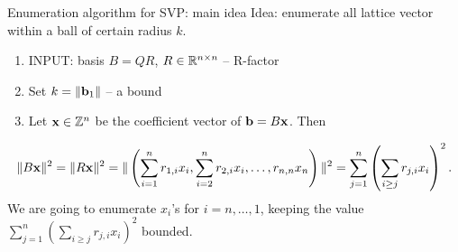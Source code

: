 \documentclass[usenames,dvipsnames, 9pt, aspectratio=169]{beamer}
\begin{document}
\begin{frame}{Enumeration algorithm for SVP: main idea}
\Large
{\color{Orange} Idea:} enumerate all lattice vector within a ball of certain radius $k$.

\begin{enumerate}
	\item INPUT: basis $B = QR$, $R \in {{\mathbb R}}^{n \times n}$ -- R-factor \pause
	\item Set $k = \| \mathbf{b}_1 \|$ -- a bound 
	\item Let $\mathbf{x} \in {{\mathbb Z}}^n$ be the coefficient vector of $\mathbf{b} = B\mathbf{x}$. Then
\end{enumerate}
\begin{align*}\label{eq:enum_norm}
\| B\mathbf{x} \|^2   = \| R\mathbf{x} \|^2 = \| \left( \sum_{i=1}^n r_{1,i}x_i, \sum_{i=2}^n r_{2,i}x_i, \ldots, r_{n,n} x_n \right) \|^2 
 = \sum_{j=1}^n \left( \sum_{i \geq j} r_{j,i} x_i \right)^2.
\end{align*}
\pause
We are going to enumerate $x_i$'s for $i = n, \ldots, 1$, keeping the value $\sum_{j=1}^n \left( \sum_{i \geq j} r_{j,i} x_i \right)^2$ bounded.

\end{frame}
\end{document}
